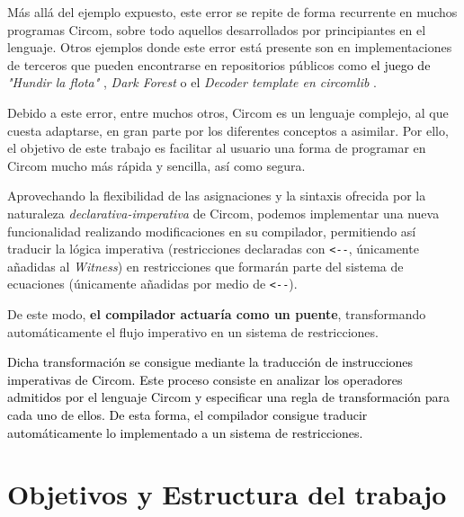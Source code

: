 \documentclass[a4paper,12pt]{report}
\begin{document}
	\vspace{0.2cm}
	\noindent Más allá del ejemplo expuesto, este error se repite de forma recurrente en muchos programas Circom, sobre todo aquellos desarrollados por principiantes en el lenguaje. Otros ejemplos donde este error está presente son en implementaciones de terceros que pueden encontrarse en repositorios públicos como \textcolor{black}{el juego de} \textit{"Hundir la flota"} \cite{battlezips_circom}, \textit{Dark Forest} \cite{darkforest_circuits_2021} o el \textit{Decoder template en circomlib} \cite{iden3_multiplexer_2023}.
	
	
	\vspace{0.2cm}
	\noindent Debido a este error, entre muchos otros, Circom es un lenguaje complejo, al que cuesta adaptarse, en gran parte por los diferentes conceptos a asimilar. Por ello, el objetivo de este trabajo es facilitar al usuario una forma de programar en Circom mucho más rápida y sencilla, así como segura.
	
	
	\vspace{0.2cm}
	\noindent Aprovechando la flexibilidad de las asignaciones y la sintaxis ofrecida por la naturaleza \textit{declarativa-imperativa} de Circom, podemos implementar una nueva funcionalidad realizando modificaciones en su compilador, permitiendo así traducir la lógica imperativa (restricciones declaradas con \texttt{<-}\texttt{-}, únicamente añadidas al \textit{Witness}) en restricciones que formarán parte del sistema de ecuaciones (únicamente añadidas por medio de \texttt{<-}\texttt{-}).
	
	\vspace{0.2cm}
	\noindent De este modo, \textbf{el compilador actuaría como un puente}, transformando automáticamente el flujo imperativo en un sistema de restricciones.
	
	\vspace{0.4cm}
	\noindent \textcolor{black}{Dicha transformación se consigue mediante la traducción de instrucciones imperativas de Circom. Este proceso consiste en analizar los operadores admitidos por el lenguaje Circom y especificar una regla de transformación para cada uno de ellos. De esta forma, el compilador consigue traducir automáticamente lo implementado a un sistema de restricciones.}
	
	\section{Objetivos y Estructura del trabajo}
	
\end{document}

